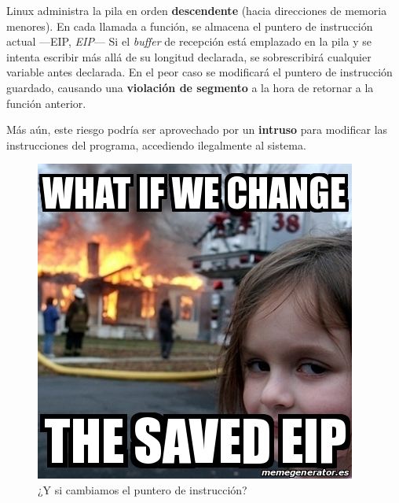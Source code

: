 \smallskip

Linux administra la pila en orden \textbf{descendente} (hacia direcciones de memoria menores). En cada llamada a función, se almacena el puntero de instrucción actual ---\acrshort{EIP}, \textit{\acrlong{EIP}}--- Si el \textit{buffer} de recepción está emplazado en la pila y se intenta escribir más allá de su longitud declarada, se sobrescribirá cualquier variable antes declarada. En el peor caso se modificará el puntero de instrucción guardado, causando una \textbf{violación de segmento} a la hora de retornar a la función anterior.

Más aún, este riesgo podría ser aprovechado por un \textbf{intruso} para modificar las instrucciones del programa, accediendo ilegalmente al sistema.

\smallskip

\begin{figure}[H]
	\noindent \begin{centering}
		\includegraphics[width=\linewidth/2]{capitulo5/disaster_girl}
		\par\end{centering}
	\smallskip
	\caption{\label{fig:disaster_girl} ¿Y si cambiamos el puntero de instrucción?}
\end{figure} 

\smallskip

